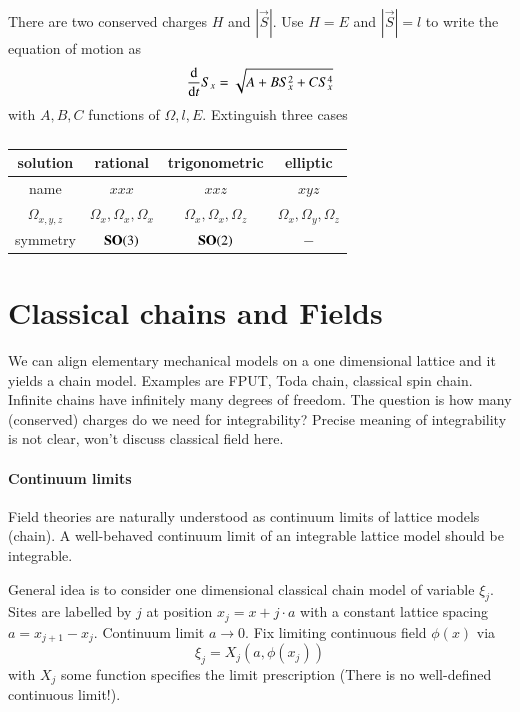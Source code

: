 There are two conserved charges $H$ and $|\vec{S}|$. Use $H = E$ and $|\vec{S}|=l$ to write the equation of motion as 
\begin{equation*}
	\dv{t} S_x = \sqrt{A + B S_x^2 + C S_x^4}
\end{equation*}
with $A, B, C$ functions of $\Omega, l , E$. Extinguish three cases
\begin{table}[ht]
	\centering
	\label{tab:label}
	\begin{tabular}{c c c c}
	\toprule
	solution & rational & trigonometric & elliptic \\
	\midrule
	name & $x x x$ & $x x z$ & $x y z$ \\
	$\Omega_{x, y, z}$ & $\Omega_x, \Omega_x, \Omega_x$ & $\Omega_{x}, \Omega_x, \Omega_z$ & $\Omega_x, \Omega_y, \Omega_z$ \\
	symmetry & $\mathbf{SO}(3)$ & $\mathbf{SO}(2)$ & $-$ \\
	\bottomrule
	\end{tabular}
	\caption{}
\end{table}

\section{Classical chains and Fields}
We can align elementary mechanical models on a one dimensional lattice and it yields a chain model. Examples are FPUT, Toda chain, classical spin chain. Infinite chains have infinitely many degrees of freedom. The question is how many (conserved) charges do we need for integrability? Precise meaning of integrability is not clear, won't discuss classical field here.

\paragraph{Continuum limits} 
Field theories are naturally understood as continuum limits of lattice models (chain). A well-behaved continuum limit of an integrable lattice model should be integrable.

General idea is to consider one dimensional classical chain model of variable $\xi_j$. Sites are labelled by $j$ at position $x_j = x + j\cdot a$ with a constant lattice spacing $a = x_{j+1}  - x_j$. Continuum limit $a\rightarrow 0$. Fix limiting continuous field $\phi(x)$ via 
\begin{equation*}
	\xi_j = X_j (a, \phi(x_j))
\end{equation*}
with $X_j$ some function specifies the limit prescription (There is no well-defined continuous limit!).

